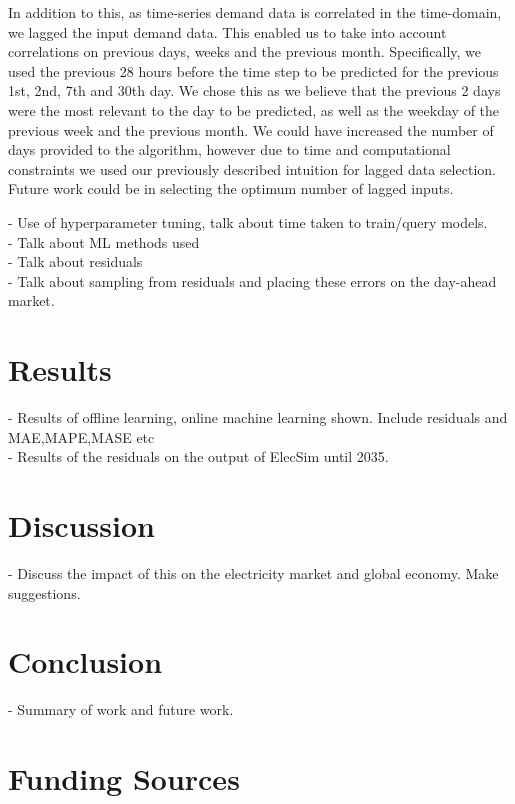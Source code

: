 \documentclass[final,3p,times,twocolumn,numbers]{elsarticle}
\begin{document}
In addition to this, as time-series demand data is correlated in the time-domain, we lagged the input demand data. This enabled us to take into account correlations on previous days, weeks and the previous month. Specifically, we used the previous 28 hours before the time step to be predicted for the previous 1st, 2nd, 7th and 30th day. We chose this as we believe that the previous 2 days were the most relevant to the day to be predicted, as well as the weekday of the previous week and the previous month. We could have increased the number of days provided to the algorithm, however due to time and computational constraints we used our previously described intuition for lagged data selection. Future work could be in selecting the optimum number of lagged inputs.



- Use of hyperparameter tuning, talk about time taken to train/query models.\\
- Talk about ML methods used\\
- Talk about residuals\\
- Talk about sampling from residuals and placing these errors on the day-ahead market.\\


\section{Results}
\label{sec:results}

- Results of offline learning, online machine learning shown. Include residuals and MAE,MAPE,MASE etc\\

- Results of the residuals on the output of ElecSim until 2035.\\

\section{Discussion}
\label{sec:discussion}

- Discuss the impact of this on the electricity market and global economy. Make suggestions.

\section{Conclusion}
\label{sec:conclusion}

- Summary of work and future work.

\section{Funding Sources}
\end{document}
